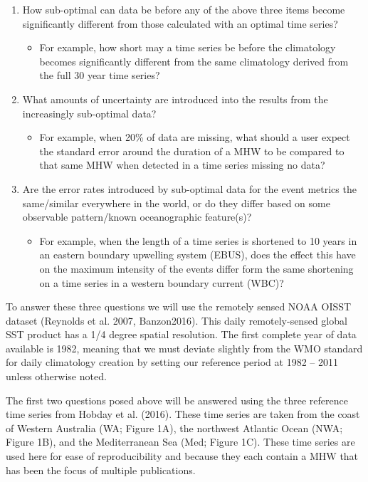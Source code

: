 \documentclass[]{article}
\providecommand{\tightlist}{%
  \setlength{\itemsep}{0pt}\setlength{\parskip}{0pt}}
\begin{document}
\begin{enumerate}
\def\labelenumi{\arabic{enumi})}
\tightlist
\item
  How sub-optimal can data be before any of the above three items become
  significantly different from those calculated with an optimal time
  series?

  \begin{itemize}
  \tightlist
  \item
    For example, how short may a time series be before the climatology
    becomes significantly different from the same climatology derived
    from the full 30 year time series?
  \end{itemize}
\item
  What amounts of uncertainty are introduced into the results from the
  increasingly sub-optimal data?

  \begin{itemize}
  \tightlist
  \item
    For example, when 20\% of data are missing, what should a user
    expect the standard error around the duration of a MHW to be
    compared to that same MHW when detected in a time series missing no
    data?
  \end{itemize}
\item
  Are the error rates introduced by sub-optimal data for the event
  metrics the same/similar everywhere in the world, or do they differ
  based on some observable pattern/known oceanographic feature(s)?

  \begin{itemize}
  \tightlist
  \item
    For example, when the length of a time series is shortened to 10
    years in an eastern boundary upwelling system (EBUS), does the
    effect this have on the maximum intensity of the events differ form
    the same shortening on a time series in a western boundary current
    (WBC)?
  \end{itemize}
\end{enumerate}

To answer these three questions we will use the remotely sensed NOAA
OISST dataset (Reynolds et al. 2007, Banzon2016). This daily
remotely-sensed global SST product has a 1/4 degree spatial resolution.
The first complete year of data available is 1982, meaning that we must
deviate slightly from the WMO standard for daily climatology creation by
setting our reference period at 1982 -- 2011 unless otherwise noted.

The first two questions posed above will be answered using the three
reference time series from Hobday et al. (2016). These time series are
taken from the coast of Western Australia (WA; Figure 1A), the northwest
Atlantic Ocean (NWA; Figure 1B), and the Mediterranean Sea (Med; Figure
1C). These time series are used here for ease of reproducibility and
because they each contain a MHW that has been the focus of multiple
publications.
\end{document}
